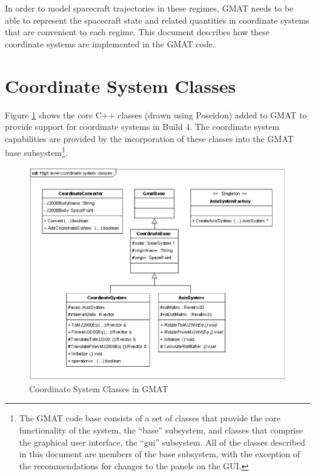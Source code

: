 In order to model spacecraft trajectories in these regimes, GMAT needs to be able to represent the
spacecraft state and related quantities in coordinate systems that are convenient to each regime.
This document describes how these coordinate systems are implemented in the GMAT code.


\section{\label{sec:CSClassDescription}Coordinate System Classes}

Figure \ref{figure:HighLevelCSClasses} shows the core C++ classes (drawn using
Poseidon\cite{poseidon}) added to GMAT to provide support for coordinate systems in Build 4. The
coordinate system capabilities are provided by the incorporation of these classes into the GMAT base
subsystem\footnote{The GMAT code base consists of a set of classes that provide the core
functionality of the system, the {}``base'' subsystem, and classes that comprise the graphical user
interface, the {}``gui'' subsystem.  All of the classes described in this document are members of
the base subsystem, with the exception of the recommendations for changes to the panels on the
GUI.}.

\begin{figure}[htb]
\begin{center}
\includegraphics[scale=0.5]{Images/Highlevelcoordinatesystemclasses.eps}
\caption{\label{figure:HighLevelCSClasses}Coordinate System Classes in GMAT}
\end{center}
\end{figure}

